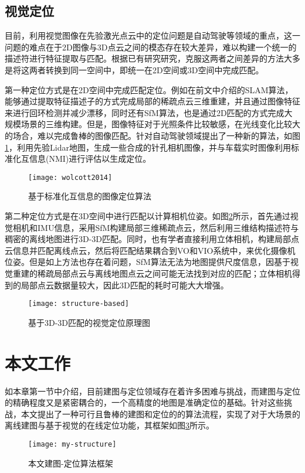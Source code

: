 \subsection{视觉定位}
目前，利用视觉图像在先验激光点云中的定位问题是自动驾驶等领域的重点，这一问题的难点在于2D图像与3D点云之间的模态存在较大差异，难以构建一个统一的描述符进行特征提取与匹配。根据已有研究研究，克服这两者之间差异的方法大多是将这两者转换到同一空间中，即统一在2D空间或3D空间中完成匹配\cite{yu2020monocular}。

第一种定位方式是在2D空间中完成匹配定位。例如在前文中介绍的SLAM算法，能够通过提取特征描述子的方式完成局部的稀疏点云三维重建，并且通过图像特征来进行回环检测并减少漂移，同时还有SfM算法，也是通过2D匹配的方式完成大规模场景的三维构建。但是，图像特征对于光照条件比较敏感，在光线变化比较大的场合，难以完成鲁棒的图像匹配。\citet{wolcott2014visual}针对自动驾驶领域提出了一种新的算法，如图\ref{wolcott2014}，利用先验Lidar地图，生成一些合成的针孔相机图像，并与车载实时图像利用标准化互信息(NMI)进行评估以生成定位。
\begin{figure}
	\centering
	\texttt{[image: wolcott2014]}
	\caption{基于标准化互信息的图像定位算法}
	\label{wolcott2014}
\end{figure}

第二种定位方式是在3D空间中进行匹配以计算相机位姿。如图\ref{structure-based}所示，\citet{gawel2016structure}首先通过视觉相机和IMU信息，采用SfM构建局部三维稀疏点云，然后利用三维结构描述符与稠密的离线地图进行3D-3D匹配。同时，也有学者直接利用立体相机，构建局部点云信息并匹配离线点云，然后将匹配结果耦合到VO和VIO系统中，来优化摄像机位姿\cite{kim2018stereo}。但是如上方法也存在着问题，SfM算法无法为地图提供尺度信息，因基于视觉重建的稀疏局部点云与离线地图点云之间可能无法找到对应的匹配；立体相机得到的局部点云数据量较大，因此3D匹配的耗时可能大大增强。
\begin{figure}
	\centering
	\texttt{[image: structure-based]}
	\caption{基于3D-3D匹配的视觉定位原理图}
	\label{structure-based}
\end{figure}

\section{本文工作}
如本章第一节中介绍，目前建图与定位领域存在着许多困难与挑战，而建图与定位的精确程度又是紧密耦合的，一个高精度的地图是准确定位的基础。针对这些挑战，本文提出了一种可行且鲁棒的建图和定位的的算法流程，实现了对于大场景的离线建图与基于视觉的在线定位功能，其框架如图\ref{my-structure}所示。
\begin{figure}
	\centering
	\texttt{[image: my-structure]}
	\caption{本文建图-定位算法框架}
	\label{my-structure}
\end{figure}

